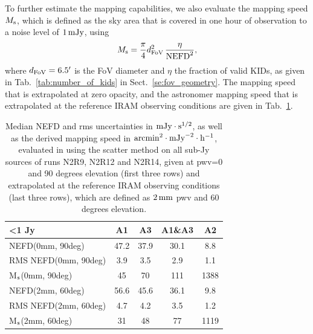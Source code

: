 To further estimate the mapping capabilities, we also evaluate the
mapping speed $M_{\rm{s}}$, which is defined as the sky area that is covered in one
hour of observation to a noise level of $1\,\rm{mJy}$, using
\begin{equation}
M_{\rm{s}} = \frac{\pi}{4} d_{\rm{FoV}}^2 \, \frac{\eta}{\rm{NEFD}^2},
\end{equation}
where $d_{\rm{FoV}} = 6.5'$ is the FoV diameter and $\eta$ the
fraction of valid KIDs, as given in Tab.~\ref{tab:number_of_kids} in
Sect.~\ref{se:fov_geometry}.
The mapping speed that is extrapolated at zero opacity, and the astronomer
mapping speed that is extrapolated at the reference IRAM observing conditions are
given in Tab.~\ref{tab:nefd_astro}.   

\begin{table}[!thbp]
\begin{center}
\begin{tabular}{|l|c|c|c|c|}
  \hline
 <1 Jy               & A1      &   A3    &   A1\&A3 &    A2    \\  
\hline\hline
NEFD\small{(0mm, 90deg)}             & 47.2    & 37.9    &    30.1  &    8.8   \\
RMS NEFD\small{(0mm, 90deg)}         &  3.9    &  3.5    &     2.9  &    1.1   \\
M$_{\rm{s}}$\small{(0mm, 90deg)}      & 45      &  70     &    111   &   1388   \\
\hline
NEFD\small{(2mm, 60deg)}         & 56.6    & 45.6    &    36.1  &    9.8   \\
RMS NEFD\small{(2mm, 60deg)}     &  4.7    & 4.2     &     3.5  &    1.2   \\
M$_{\rm{s}}$\small{(2mm, 60deg)}  &  31    & 48       &    77   &   1119   \\
\hline
\hline
\end{tabular}
\caption[NEFD estimates on all sub-Jy sources]{Median NEFD and rms
uncertainties in $\rm{mJy}\cdot \rm{s}^{1/2}$, as well as the derived mapping
speed in $\rm{arcmin}^2\cdot\rm{mJy}^{-2}\cdot\rm{h}^{-1}$, evaluated
in using the scatter method on all sub-Jy sources of runs N2R9, N2R12
and N2R14, given at pwv=0 and 90 degrees elevation (first three rows) and extrapolated at the
reference IRAM observing conditions (last three rows), which are defined
as $2\,\rm{mm}$ pwv and 60 degrees elevation.}
\label{tab:nefd_astro}
\end{center}
\end{table}


